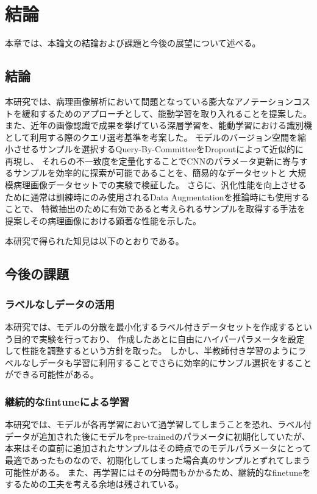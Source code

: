\chapter{結論}
本章では、本論文の結論および課題と今後の展望について述べる。

\section{結論}
本研究では、病理画像解析において問題となっている膨大なアノテーションコストを緩和するためのアプローチとして、能動学習を取り入れることを提案した。
また、近年の画像認識で成果を挙げている深層学習を、能動学習における識別機として利用する際のクエリ選考基準を考案した。
モデルのバージョン空間を縮小させるサンプルを選択するQuery-By-CommitteeをDropoutによって近似的に再現し、
それらの不一致度を定量化することでCNNのパラメータ更新に寄与するサンプルを効率的に探索が可能であることを、簡易的なデータセットと
大規模病理画像データセットでの実験で検証した。
さらに、汎化性能を向上させるために通常は訓練時にのみ使用されるData Augmentationを推論時にも使用することで、
特徴抽出のために有効であると考えられるサンプルを取得する手法を提案しその病理画像における顕著な性能を示した。

本研究で得られた知見は以下のとおりである。

\section{今後の課題}

\subsection{ラベルなしデータの活用}
本研究では、モデルの分散を最小化するラベル付きデータセットを作成するという目的で実験を行っており、
作成したあとに自由にハイパーパラメータを設定して性能を調整するという方針を取った。
しかし、半教師付き学習のようにラベルなしデータも学習に利用することでさらに効率的にサンプル選択をすることができる可能性がある。

\subsection{継続的なfintuneによる学習}
本研究では、モデルが各再学習において過学習してしまうことを恐れ、ラベル付データが追加された後にモデルをpre-trainedのパラメータに初期化していたが、
本来はその直前に追加されたサンプルはその時点でのモデルパラメータにとって最適であったものなので、初期化してしまった場合真のサンプルとずれてしまう可能性がある。
また、再学習にはその分時間もかかるため、継続的なfinetuneをするための工夫を考える余地は残されている。
